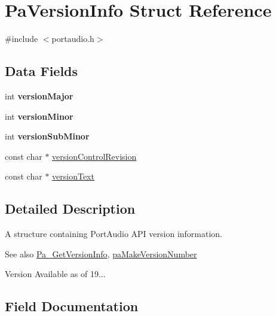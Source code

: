 \hypertarget{struct_pa_version_info}{}\section{Pa\+Version\+Info Struct Reference}
\label{struct_pa_version_info}


{\ttfamily \#include $<$portaudio.\+h$>$}

\subsection*{Data Fields}
\begin{DoxyCompactItemize}
\item 
\mbox{\label{struct_pa_version_info_a98da9d58cccbb07d82731bd51526da33}} 
int {\bfseries version\+Major}
\item 
\mbox{\label{struct_pa_version_info_adbb78d06aff1f9fc6328987c36052f87}} 
int {\bfseries version\+Minor}
\item 
\mbox{\label{struct_pa_version_info_a307d89c6be2aa100a2376cb002bf3b63}} 
int {\bfseries version\+Sub\+Minor}
\item 
const char $\ast$ \hyperlink{struct_pa_version_info_a4fb1c35ae79965090b81a015b1eff05f}{version\+Control\+Revision}
\item 
const char $\ast$ \hyperlink{struct_pa_version_info_a0364a83bb08835d1d044611a4bda5477}{version\+Text}
\end{DoxyCompactItemize}


\subsection{Detailed Description}
A structure containing Port\+Audio A\+PI version information. \begin{DoxySeeAlso}{See also}
\hyperlink{portaudio_8h_ad74adc9406a64c3fb13c228c3381a121}{Pa\+\_\+\+Get\+Version\+Info}, \hyperlink{portaudio_8h_ac20e3ac459960f140910d94b5a61125e}{pa\+Make\+Version\+Number} 
\end{DoxySeeAlso}
\begin{DoxyVersion}{Version}
Available as of 19... 
\end{DoxyVersion}


\subsection{Field Documentation}
\mbox{\label{struct_pa_version_info_a4fb1c35ae79965090b81a015b1eff05f}} 
